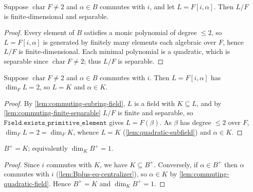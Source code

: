 \begin{lemma}
    \label{lem:commuting-finite-separable}
    Suppose $\operatorname{char} F \neq 2$ and $\alpha \in B$ commutes with $i$, and
    let $L = F[i,\alpha]$. Then $L/F$ is finite-dimensional and separable.
\end{lemma}
\begin{proof}
    Every element of $B$ satisfies a monic polynomial of degree $\leq 2$, so
    $L = F[i,\alpha]$ is generated by finitely many elements each algebraic over
    $F$, hence $L/F$ is finite-dimensional. Each minimal polynomial is a quadratic,
    which is separable since $\operatorname{char} F \neq 2$; thus $L/F$ is separable.
\end{proof}

\begin{lemma}
    \label{lem:commuting-quadratic-field}
    Suppose $\operatorname{char} F \neq 2$ and $\alpha \in B$ commutes with $i$.
    Then $L = F[i,\alpha]$ has $\dim_F L = 2$, so $L = K$ and $\alpha \in K$.
\end{lemma}
\begin{proof}
    By \ref{lem:commuting-subring-field}, $L$ is a field with $K \subseteq L$, and
    by \ref{lem:commuting-finite-separable} $L/F$ is finite and separable, so
    $\texttt{Field.exists\_primitive\_element}$ gives $L = F(\beta)$. As $\beta$ has
    degree $\leq 2$ over $F$, $\dim_F L = 2 = \dim_F K$, whence $L = K$
    (\ref{lem:quadratic-subfield}) and $\alpha \in K$.
\end{proof}

\begin{lemma}
    \label{lem:Bplus-eq-K}
    $B^{+} = K$; equivalently $\dim_K B^{+} = 1$.
\end{lemma}
\begin{proof}
    Since $i$ commutes with $K$, we have $K \subseteq B^{+}$. Conversely, if
    $\alpha \in B^{+}$ then $\alpha$ commutes with $i$
    (\ref{lem:Bplus-eq-centralizer}), so $\alpha \in K$ by
    \ref{lem:commuting-quadratic-field}. Hence $B^{+} = K$ and $\dim_K B^{+} = 1$.
\end{proof}

